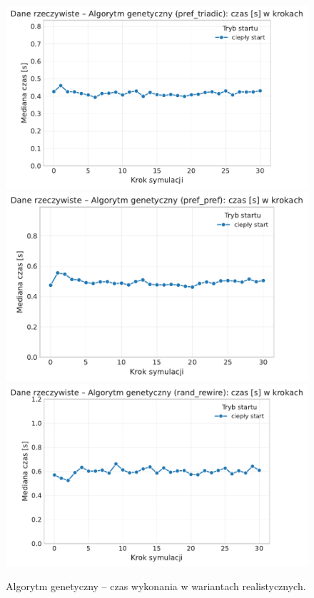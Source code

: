 \begin{figure}[H]
  \centering
  \includegraphics[width=0.62\linewidth]{assets/figures/dynamic/real/real_algorytm_genetyczny_time_over_steps_pref_triadic.pdf}\\[0.4em]
  \includegraphics[width=0.62\linewidth]{assets/figures/dynamic/real/real_algorytm_genetyczny_time_over_steps_pref_pref.pdf}\\[0.4em]
  \includegraphics[width=0.62\linewidth]{assets/figures/dynamic/real/real_algorytm_genetyczny_time_over_steps_rand_rewire.pdf}
  \caption{Algorytm genetyczny -- czas wykonania w wariantach realistycznych.}
  \label{fig:dyn-real-genetic-time}
\end{figure}

